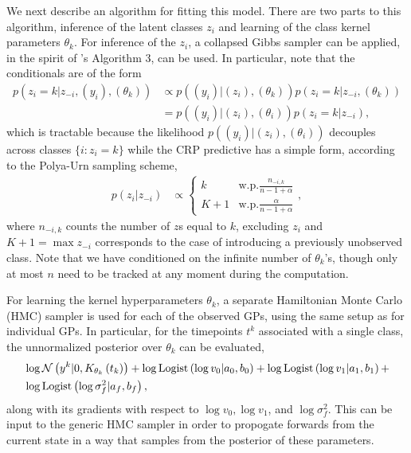 \documentclass{article}
\begin{document}
We next describe an algorithm for fitting this model. There are two parts to
this algorithm, inference of the latent classes $z_i$ and learning of the class
kernel parameters $\theta_k$. For inference of the $z_i$, a collapsed Gibbs
sampler can be applied, in the spirit of \citep{neal2000markov}'s Algorithm 3,
can be used. In particular, note that the conditionals are of the form
\begin{align}
  p\left(z_i = k \vert z_{-i}, \left(y_i\right), \left(\theta_k\right)\right) &\propto p\left(\left(y_i\right) \vert \left(z_i\right),  \left(\theta_k\right)\right)
  p\left(z_i = k \vert z_{-i}, \left(\theta_k\right)\right) \nonumber \\
  &= p\left(\left(y_i\right) \vert \left(z_i\right), \left(\theta_i\right)\right)p\left(z_i = k \vert z_{-i}\right), \label{eq:igp_conditional}
\end{align}
which is tractable because the likelihood $p\left(\left(y_i\right) \vert
\left(z_i\right), \left(\theta_i\right)\right)$ decouples across classes $\{i :
z_i = k\}$ while the CRP predictive has a simple form, according to the
Polya-Urn sampling scheme,
\begin{align*}
  p\left(z_i\vert z_{-i}\right) &\propto \begin{cases}
    k &\text{w.p.} \frac{n_{-i, k}}{n - 1 + \alpha} \\
    K + 1 &\text{w.p.} \frac{\alpha}{n - 1 + \alpha}
    \end{cases},
\end{align*}
where $n_{-i, k}$ counts the number of $z$s equal to $k$, excluding $z_i$ and $K
+ 1 = \max{z_{-i}}$ corresponds to the case of introducing a previously
unobserved class. Note that we have conditioned on the infinite number
of $\theta_k$'s, though only at most $n$ need to be tracked at any moment during
the computation.

For learning the kernel hyperparameters $\theta_k$, a separate Hamiltonian Monte
Carlo (HMC) sampler is used for each of the observed GPs, using the same setup
as \citep{rasmussen2006gaussian} for individual GPs. In particular, for the
timepoints $t^k$ associated with a single class, the unnormalized posterior over
$\theta_k$ can be evaluated,
\begin{align*}
  &\log \mathcal{N}\left(y^k \vert 0, K_{\theta_k}\left(t_k\right)\right) +
  \log \text{Logist}\left(\log v_0 \vert a_0, b_0\right) +
  \log \text{Logist}\left(\log v_1 \vert a_1, b_1\right) +\\
  &\log \text{Logist}\left(\log \sigma_f^2 \vert a_f, b_f\right),
\end{align*}
along with its gradients with respect to $\log v_0, \log v_1$, and $\log
\sigma_f^2$. This can be input to the generic HMC sampler in order to propogate
forwards from the current state in a way that samples from the posterior of
these parameters.
\end{document}
